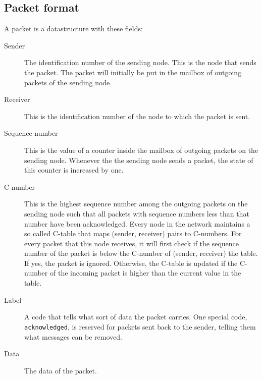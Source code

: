 \documentclass{article}
\begin{document}
\subsection{Packet format}
A packet is a datastructure with these fields:
\begin{description}
  \item[Sender] The identification number of the sending node. This is the node that sends the packet. The packet will initially be put in the mailbox of outgoing packets of the sending node.
  \item[Receiver] This is the identification number of the node to which the packet is sent.
  \item[Sequence number] This is the value of a counter inside the mailbox of outgoing packets on the sending node. Whenever the the sending node sends a packet, the state of this counter is increased by one.
  \item[C-number] This is the highest sequence number among the outgoing packets on the sending node such that all packets with sequence numbers less than that number have been acknowledged. Every node in the network maintains a so called C-table that maps (sender, receiver) pairs to C-numbers. For every packet that this node receives, it will first check if the sequence number of the packet is below the C-number of (sender, receiver) the table. If yes, the packet is ignored. Otherwise, the C-table is updated if the C-number of the incoming packet is higher than the current value in the table.
  \item[Label] A code that tells what sort of data the packet carries. One special code, \texttt{acknowledged}, is reserved for packets sent back to the sender, telling them what messages can be removed.
  \item[Data] The data of the packet.
\end{description}
\end{document}
